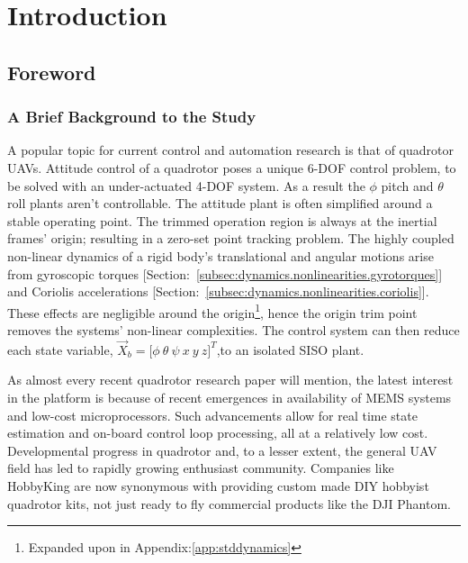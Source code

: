 \chapter{Introduction}
\label{ch:intro}
\section{Foreword}
\label{sec:intro.foreword}
\subsection{A Brief Background to the Study}
\label{subsec:intro.foreword.background}
A popular topic for current control and automation research is that of quadrotor UAVs. Attitude control of a quadrotor poses a unique 6-DOF control problem, to be solved with an under-actuated 4-DOF system. As a result the $\phi$ pitch and $\theta$ roll plants aren't controllable. The attitude plant is often simplified around a stable operating point. The trimmed operation region is always at the inertial frames' origin; resulting in a zero-set point tracking problem. The highly coupled non-linear dynamics of a rigid body's translational and angular motions arise from gyroscopic torques [Section:~\ref{subsec:dynamics.nonlinearities.gyrotorques}] and Coriolis accelerations [Section:~\ref{subsec:dynamics.nonlinearities.coriolis}]. These effects are negligible around the origin\footnote{Expanded upon in Appendix:\ref{app:stddynamics}}, hence the origin trim point removes the systems' non-linear complexities. The control system can then reduce each state variable, $\vec{X}_b=\big[\phi~\theta~\psi~x~y~z\big]^T$,to an isolated SISO plant.
\par
As almost every recent quadrotor research paper will mention, the latest interest in the platform is because of recent emergences in availability of MEMS systems and low-cost microprocessors. Such advancements allow for real time state estimation and on-board control loop processing, all at a relatively low cost. Developmental progress in quadrotor and, to a lesser extent, the general UAV field has led to rapidly growing enthusiast community. Companies like HobbyKing\cite{hobbyking} are now synonymous with providing custom made DIY hobbyist quadrotor kits, not just ready to fly commercial products like the DJI Phantom\cite{phantom}.
